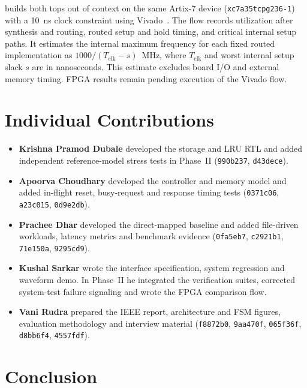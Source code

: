 \documentclass[conference]{IEEEtran}
\begin{document}
 builds both tops out of context
on the same Artix-7 device (\texttt{xc7a35tcpg236-1}) with a 10~ns clock
constraint using Vivado~\cite{vivado2023}. The flow records utilization
after synthesis and routing, routed setup and hold timing, and critical
internal setup paths. It estimates the internal maximum frequency for
each fixed routed implementation as $1000/(T_{\mathrm{clk}}-s)$~MHz,
where $T_{\mathrm{clk}}$ and worst internal setup slack $s$ are in
nanoseconds. This estimate excludes board I/O and external memory
timing. FPGA results remain pending execution of the Vivado flow.

\section{Individual Contributions}
\label{sec:contributions}

\begin{itemize}
  \item \textbf{Krishna Pramod Dubale} developed the storage and LRU
        RTL and added independent reference-model stress tests in
        Phase~II (\texttt{990b237}, \texttt{d43dece}).
  \item \textbf{Apoorva Choudhary} developed the controller and memory
        model and added in-flight reset, busy-request and response
        timing tests (\texttt{0371c06}, \texttt{a23c015}, \texttt{0d9e2db}).
  \item \textbf{Prachee Dhar} developed the direct-mapped baseline and
        added file-driven workloads, latency metrics and benchmark
        evidence (\texttt{0fa5eb7}, \texttt{c2921b1}, \texttt{71e150a},
        \texttt{9295cd9}).
  \item \textbf{Kushal Sarkar} wrote the interface specification,
        system regression and waveform demo. In Phase~II he integrated
        the verification suites, corrected system-test failure signaling
        and wrote the FPGA comparison flow.
  \item \textbf{Vani Rudra} prepared the IEEE report, architecture and
        FSM figures, evaluation methodology and interview material
        (\texttt{f8872b0}, \texttt{9aa470f}, \texttt{065f36f},
        \texttt{d8bb6f4}, \texttt{4557fdf}).
\end{itemize}

\section{Conclusion}
\label{sec:conclusion}
\end{document}
